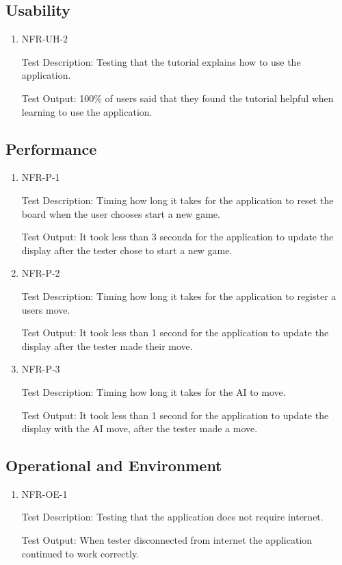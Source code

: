 \documentclass[12pt, titlepage]{article}
\begin{document}
\subsection{Usability}
\begin{enumerate}
    \item {NFR-UH-2}
    \label{NFR-UH-2}    
    
    Test Description: Testing that the tutorial explains how to use the application.
    
    Test Output: 100\% of users said that they found the tutorial helpful when learning to use the application.
\end{enumerate}

\subsection{Performance}
\begin{enumerate}
    \item {NFR-P-1}
    \label{NFR-P-1}    
    
    Test Description: Timing how long it takes for the application to reset the board when the user chooses start a new game.
    
    Test Output: It took less than 3 seconda for the application to update the display after the tester chose to start a new game.
    \item {NFR-P-2}
    \label{NFR-P-2}    
    
    Test Description: Timing how long it takes for the application to register a users move.
    
    Test Output: It took less than 1 second for the application to update the display after the tester made their move.
    \item {NFR-P-3}
    \label{NFR-P-3}    
    
    Test Description: Timing how long it takes for the AI to move.
    
    Test Output: It took less than 1 second for the application to update the display with the AI move, after the tester made a move.
\end{enumerate}

\subsection{Operational and Environment}
\begin{enumerate}
    \item {NFR-OE-1}
    \label{NFR-OE-1}    
    
    Test Description: Testing that the application does not require internet.
    
    Test Output: When tester disconnected from internet the application continued to work correctly.
\end{enumerate}
\end{document}

